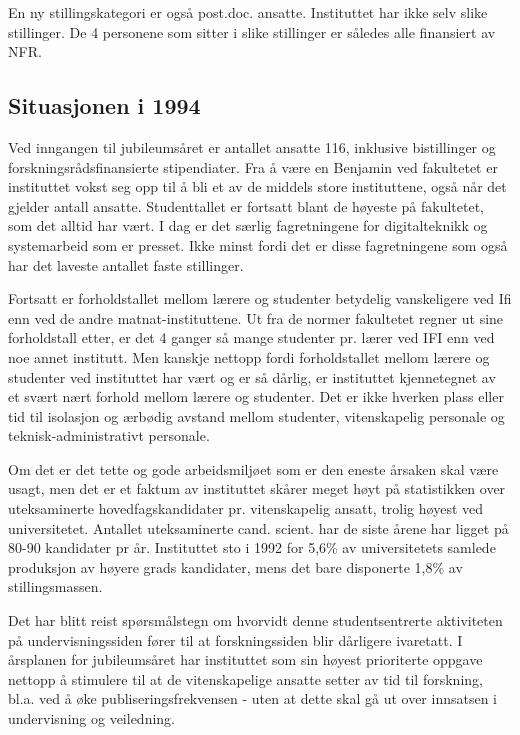 \documentclass[../main.tex]{subfiles}
\begin{document}
En ny stillingskategori er også post.doc. ansatte. Instituttet har ikke selv slike stillinger. De 4 personene som sitter i slike stillinger er således alle finansiert av NFR.

\subsection{Situasjonen i 1994}
Ved inngangen til jubileumsåret er antallet ansatte 116, inklusive bistillinger og forskningsrådsfinansierte stipendiater. Fra å være en Benjamin ved fakultetet er instituttet vokst seg opp til å bli et av de middels store instituttene, også når det gjelder antall ansatte. Studenttallet er fortsatt blant de høyeste på fakultetet, som det alltid har vært. I dag er det særlig fagretningene for digitalteknikk og systemarbeid som er presset. Ikke minst fordi det er disse fagretningene som også har det laveste antallet faste stillinger.

Fortsatt er forholdstallet mellom lærere og studenter betydelig vanskeligere ved Ifi enn ved de andre matnat-instituttene. Ut fra de normer fakultetet regner ut sine forholdstall etter, er det 4 ganger så mange studenter pr. lærer ved IFI enn ved noe annet institutt. Men kanskje nettopp fordi forholdstallet mellom lærere og studenter ved instituttet har vært og er så dårlig, er instituttet kjennetegnet av et svært nært forhold mellom lærere og studenter. Det er ikke hverken plass eller tid til isolasjon og ærbødig avstand mellom studenter, vitenskapelig personale og teknisk-administrativt personale.

Om det er det tette og gode arbeidsmiljøet som er den eneste årsaken skal være usagt, men det er et faktum av instituttet skårer meget høyt på statistikken over uteksaminerte hovedfagskandidater pr. vitenskapelig ansatt, trolig høyest ved universitetet. Antallet uteksaminerte cand. scient. har de siste årene har ligget på 80-90 kandidater pr år. Instituttet sto i 1992 for 5,6\% av universitetets samlede produksjon av høyere grads kandidater, mens det bare disponerte 1,8\% av stillingsmassen.

Det har blitt reist spørsmålstegn om hvorvidt denne studentsentrerte aktiviteten på undervisningssiden fører til at forskningssiden blir dårligere ivaretatt. I årsplanen for jubileumsåret har instituttet som sin høyest prioriterte oppgave nettopp å stimulere til at de vitenskapelige ansatte setter av tid til forskning, bl.a. ved å øke publiseringsfrekvensen - uten at dette skal gå ut over innsatsen i undervisning og veiledning.
\end{document}
